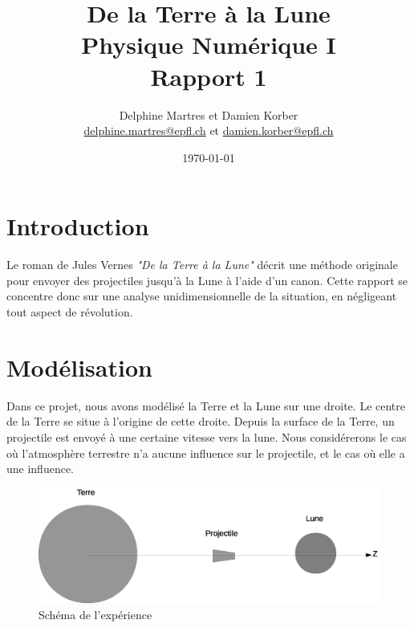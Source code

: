 \documentclass[a4paper,12pt,twoside]{article}
\newcommand{\mail}[1]{{\href{mailto:#1}{#1}}}
\begin{document}
\title{De la Terre à la Lune\\{\small Physique Numérique I}\\{\small Rapport 1}}
\date{\today}
\author{Delphine Martres et Damien Korber\\{\small \mail{delphine.martres@epfl.ch} et \mail{damien.korber@epfl.ch}}}
\maketitle
\tableofcontents %

\baselineskip=16pt
\parindent=15pt
\parskip=5pt




\section{Introduction}
Le roman de Jules Vernes \textit{"De la Terre à la Lune"} décrit une méthode originale pour envoyer des projectiles jusqu'à la Lune à l'aide d'un canon.
Cette rapport se concentre donc sur une analyse unidimensionnelle de la situation, en négligeant tout aspect de révolution.

\section{Modélisation}
Dans ce projet, nous avons modélisé la Terre et la Lune sur une droite.
Le centre de la Terre se situe à l'origine de cette droite.
Depuis la surface de la Terre, un projectile est envoyé à une certaine vitesse vers la lune.
Nous considérerons le cas où l'atmosphère terrestre n'a aucune influence sur le projectile, et le cas où elle a une influence.

\begin{figure}[h]
	\centering
	\includegraphics[width=.8\linewidth]{schema/schema.eps}
	\caption{Schéma de l'expérience}
	\label{fig:schema}
\end{figure}
\end{document}
